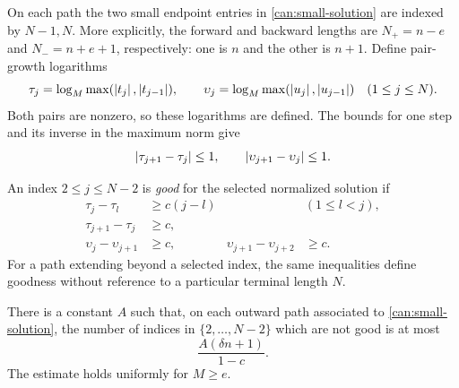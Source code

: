 On each path the two small endpoint entries in
\cref{can:small-solution} are indexed by $N-1,N$. More explicitly, the
forward and backward lengths are $N_+=n-e$ and $N_-=n+e+1$,
respectively: one is $n$ and the other is $n+1$. Define pair-growth
logarithms
\[
\tau_j=\log_M\max(\left\lvert t_j\right\rvert,\left\lvert t_{j-1}\right\rvert),\qquad
\upsilon_j=\log_M\max(\left\lvert u_j\right\rvert,\left\lvert u_{j-1}\right\rvert)
\quad(1\le j\le N).
\]
Both pairs are nonzero, so these logarithms are defined.  The bounds for
one step and its inverse in the maximum norm give
\begin{equation}\label{can:log-increments}
\left\lvert\tau_{j+1}-\tau_j\right\rvert\le1,\qquad
\left\lvert\upsilon_{j+1}-\upsilon_j\right\rvert\le1.
\end{equation}

\begin{definition}\label{can:good-definition}
An index $2\le j\le N-2$ is \emph{good} for the selected normalized
solution if
\begin{equation}\label{can:good}
\begin{aligned}
\tau_j-\tau_l&\ge c(j-l)&& (1\le l<j),\\
\tau_{j+1}-\tau_j&\ge c,\\
\upsilon_j-\upsilon_{j+1}&\ge c,
&\upsilon_{j+1}-\upsilon_{j+2}&\ge c.
\end{aligned}
\end{equation}
For a path extending beyond a selected index, the same inequalities
define goodness without reference to a particular terminal length $N$.
\end{definition}

\begin{lemma}\label{can:many-good}
There is a constant $A$ such that, on each outward path associated to
\cref{can:small-solution}, the number of indices in $\{2,\ldots,N-2\}$
which are not good is at most
\begin{equation}\label{can:bad-count}
\frac{A(\delta n+1)}{1-c}.
\end{equation}
The estimate holds uniformly for $M\ge e$.
\end{lemma}

